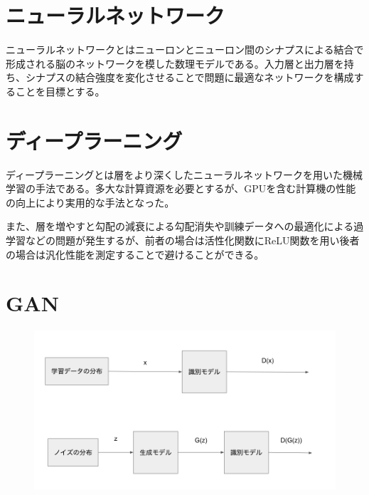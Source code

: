 \section{ニューラルネットワーク}
ニューラルネットワークとはニューロンとニューロン間のシナプスによる結合で形成される脳のネットワークを模した数理モデルである。入力層と出力層を持ち、シナプスの結合強度を変化させることで問題に最適なネットワークを構成することを目標とする。\par

\section{ディープラーニング}

ディープラーニングとは層をより深くしたニューラルネットワークを用いた機械学習の手法である。多大な計算資源を必要とするが、GPUを含む計算機の性能の向上により実用的な手法となった。\par
また、層を増やすと勾配の減衰による勾配消失や訓練データへの最適化による過学習などの問題が発生するが、前者の場合は活性化関数にReLU関数を用い後者の場合は汎化性能を測定することで避けることができる。\par


\section{GAN}

\begin{figure}[h]
    \includegraphics{figure/GAN.png}
\end{figure}

